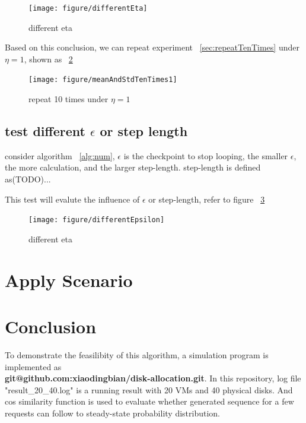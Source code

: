 \documentclass[11pt,a4paper]{article}
\begin{document}
\begin{figure}[h]
\centering
\texttt{[image: figure/differentEta]}
\caption{different eta}
\label{fig:differentEta}
\end{figure}

Based on this conclusion, we can repeat experiment ~\ref{sec:repeatTenTimes} under $\eta=1$,
shown as ~\ref{fig:meanAndStdTenTimes1}

\begin{figure}[h]
\centering
\texttt{[image: figure/meanAndStdTenTimes1]}
\caption{repeat 10 times under $\eta=1$}
\label{fig:meanAndStdTenTimes1}
\end{figure}



\subsection{\textbf{test different $\epsilon$ or step length}}
consider algorithm ~\ref{alg:num},  $\epsilon$ is the checkpoint to stop looping,
the smaller $\epsilon$, the more calculation, and the larger step-length.
step-length is defined as(TODO)...

This test will evalute the influence of $\epsilon$ or step-length,
refer to figure ~\ref{fig:differentEpsilon}

\begin{figure}[h]
\centering
\texttt{[image: figure/differentEpsilon]}
\caption{different eta}
\label{fig:differentEpsilon}
\end{figure}

\section{\textbf\normalsize{Apply Scenario}}

\section{\textbf\normalsize{Conclusion}}
To demonstrate the feasilibity of this algorithm, a simulation program is implemented 
as\\
\textbf{git@github.com:xiaodingbian/disk-allocation.git}.
In this repository, log file "result\_20\_40.log" is a running result with 20 VMs and 40 physical disks.
And cos similarity function is used to evaluate whether generated sequence for a few requests can 
follow to steady-state probability distribution.
\end{document}

